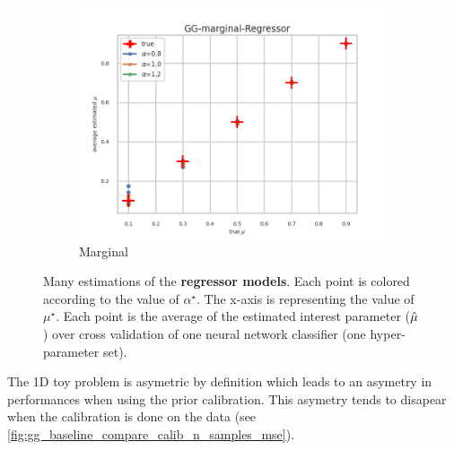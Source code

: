 \begin{figure}[ht!]
  \begin{subfigure}[t]{0.49\linewidth}
    \includegraphics[width=\linewidth]{COMPARE/GG-marginal/Regressor/profusion_true_mu_target_mean.png}
    \caption{Marginal}
  \end{subfigure}%

  \caption{Many estimations of the \textbf{regressor models}. Each point is colored according to the value of $\alpha^\star$. The x-axis is representing the value of $\mu^\star$. Each point is the average of the estimated interest parameter ($\hat\mu$) over cross validation of one neural network classifier (one hyper-parameter set).}
  \label{fig:gg_regressor_compare_calib_estimator}
\end{figure}



The 1D toy problem is asymetric by definition which leads to an asymetry in performances when using the prior calibration.
This asymetry tends to disapear when the calibration is done on the data (see \autoref{fig:gg_baseline_compare_calib_n_samples_mse}).


